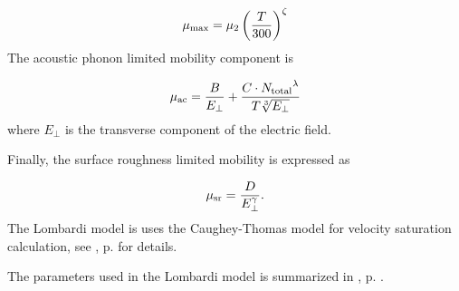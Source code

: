 \documentclass[oneside,12pt]{cgd_book}
\begin{document}
\begin{equation}
\mu_{\rm max} = \mu_2 \left( \frac{T}{300} \right)^\zeta
\end{equation}
The acoustic phonon limited mobility component is
\par
\par
\begin{equation}
\mu_{\rm ac} = \frac{B}{E_\bot} + \dfrac{C \cdot {N_{\rm total}}^{\lambda} }{ T \sqrt[3]{E_\bot}
            }
\end{equation}
where $E_\bot$ is the transverse component of the electric field.
\par
{}Finally, the surface roughness limited mobility is expressed as
\par
\par
\begin{equation}
\label{eq:Equation:Mobility:Lombardi:SR}
\mu_{\rm sr} = \frac{D}{E_{\bot}^{\gamma} }.
\end{equation}
The Lombardi model is uses the Caughey-Thomas model for velocity saturation calculation, see
, p. \pageref{sec:Equation:Mobility:Bulk:VSat}
for details.
\par
The parameters used in the Lombardi model is summarized in ,
p. \pageref{tab:Equation:Mobility:Lombardi:Param}.
\par
\end{document}
